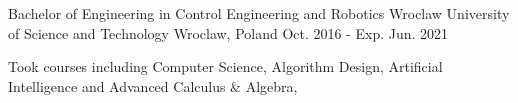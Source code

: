 
\begin{cventries}

  \cventry
    {Bachelor of Engineering in Control Engineering and Robotics} %
    {Wroclaw University of Science and Technology} %
    {Wroclaw, Poland} %
    {Oct. 2016 - Exp. Jun. 2021} %
    {
      \begin{cvitems} %
        \item {Took courses including Computer Science, Algorithm Design, Artificial Intelligence and Advanced Calculus \& Algebra,}
      \end{cvitems}
    }

\end{cventries}
